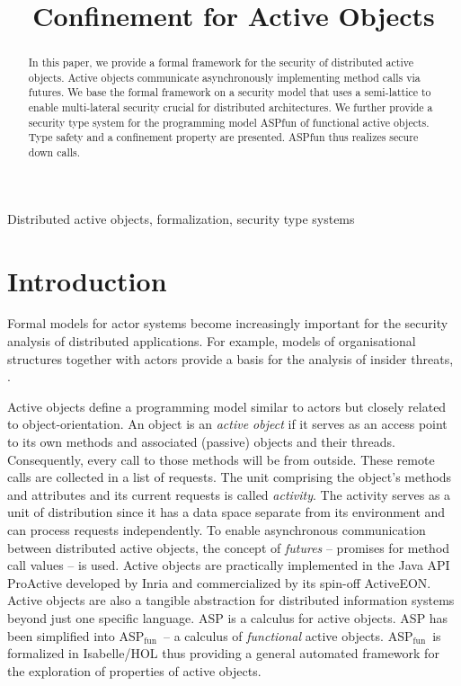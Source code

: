 \documentclass[10pt, conference, compsocconf]{IEEEtran}
\newcommand\aspfun{ASP${}_\text{fun}$\ }
\begin{document}
\title{Confinement for Active Objects}
\author{
}
\maketitle
\thispagestyle{empty}

\begin{abstract}
In this paper, we provide a formal framework for the security of distributed active objects.
Active objects communicate asynchronously implementing method calls via futures.
We base the formal framework on a security model that uses a semi-lattice to enable
multi-lateral security crucial for distributed architectures.
We further provide a security type system for the programming model ASPfun of 
functional active objects.
Type safety and a confinement property are presented. ASPfun thus realizes secure down calls.
\end{abstract}
\begin{keywords} 
Distributed active objects, formalization, security type systems
\end{keywords} 
\section{Introduction}
\label{sec:intro}
Formal models for actor systems become increasingly important  for the security
analysis of distributed applications.
For example, models of organisational structures together with actors provide a basis
for the analysis of insider threats, \cite{Probst:2008:EAS:1480242.1480308,Probst.311.1}.

Active objects define a programming model similar to actors \cite{Agha:92}
but closely related to object-orientation.  An object is an {\it active object} if 
it serves as an access point to its own methods and associated (passive) objects and their 
threads.  Consequently, every call
to those methods will be from outside. These remote calls are collected in a list of requests.
The unit comprising the object's methods and attributes and its current requests is 
called {\it activity}.
The activity serves as a unit of distribution since it has a data space separate from its environment 
and can process requests independently.
To enable asynchronous communication between distributed active objects, the concept of 
{\it futures} -- promises for method call values -- is used.
Active objects are practically implemented in the Java API ProActive \cite{CDD:CMST06}
developed by Inria and commercialized by its spin-off ActiveEON.
Active objects are also a tangible abstraction for distributed information systems beyond just
one specific language.
ASP \cite{CHSPOPL04} is a calculus for active objects. 
ASP has been simplified into \aspfun --
a calculus of {\it functional} active objects. \aspfun is formalized
in Isabelle/HOL \cite{hkl:11} thus providing a general automated framework for 
the exploration of properties of active objects.
\end{document}
